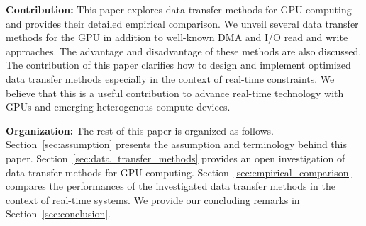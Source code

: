 \textbf{Contribution:}
This paper explores data transfer methods for GPU computing and
provides their detailed empirical comparison.
We unveil several data transfer methods for the GPU in addition to
well-known DMA and I/O read and write approaches.
The advantage and disadvantage of these methods are also discussed.
The contribution of this paper clarifies how to design and implement
optimized data transfer methods especially in the context of real-time
constraints.
We believe that this is a useful contribution to advance real-time
technology with GPUs and emerging heterogenous compute devices.

\textbf{Organization:}
The rest of this paper is organized as follows.
Section~\ref{sec:assumption} presents the assumption and terminology
behind this paper.
Section~\ref{sec:data_transfer_methods} provides an open investigation
of data transfer methods for GPU computing.
Section~\ref{sec:empirical_comparison} compares the performances of the
investigated data transfer methods in the context of real-time systems.
We provide our concluding remarks in Section~\ref{sec:conclusion}.
